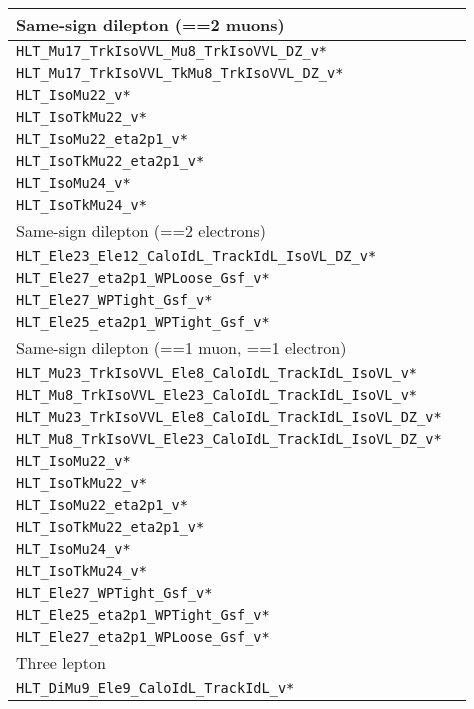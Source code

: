 \begin{table}
  \centering \footnotesize
  \begin{tabular}{ll}\hline
    Same-sign dilepton (==2 muons)\\\hline
    \verb|HLT_Mu17_TrkIsoVVL_Mu8_TrkIsoVVL_DZ_v*|\\
    \verb|HLT_Mu17_TrkIsoVVL_TkMu8_TrkIsoVVL_DZ_v*|\\
    \verb|HLT_IsoMu22_v*|\\
    \verb|HLT_IsoTkMu22_v*|\\
    \verb|HLT_IsoMu22_eta2p1_v*| \\
    \verb|HLT_IsoTkMu22_eta2p1_v*| \\
    \verb|HLT_IsoMu24_v*| \\
    \verb|HLT_IsoTkMu24_v*|\\\hline
    Same-sign dilepton (==2 electrons)\\\hline
    \verb|HLT_Ele23_Ele12_CaloIdL_TrackIdL_IsoVL_DZ_v*|\\
    \verb|HLT_Ele27_eta2p1_WPLoose_Gsf_v*|\\
    \verb|HLT_Ele27_WPTight_Gsf_v*| \\
    \verb|HLT_Ele25_eta2p1_WPTight_Gsf_v*| \\\hline
    Same-sign dilepton (==1 muon, ==1 electron)\\\hline
    \verb|HLT_Mu23_TrkIsoVVL_Ele8_CaloIdL_TrackIdL_IsoVL_v*|\\
    \verb|HLT_Mu8_TrkIsoVVL_Ele23_CaloIdL_TrackIdL_IsoVL_v*|\\
    \verb|HLT_Mu23_TrkIsoVVL_Ele8_CaloIdL_TrackIdL_IsoVL_DZ_v*| \\
    \verb|HLT_Mu8_TrkIsoVVL_Ele23_CaloIdL_TrackIdL_IsoVL_DZ_v*| \\
    \verb|HLT_IsoMu22_v*|\\
    \verb|HLT_IsoTkMu22_v*|\\
    \verb|HLT_IsoMu22_eta2p1_v*| \\
    \verb|HLT_IsoTkMu22_eta2p1_v*| \\
    \verb|HLT_IsoMu24_v*| \\
    \verb|HLT_IsoTkMu24_v*| \\
    \verb|HLT_Ele27_WPTight_Gsf_v*| \\
    \verb|HLT_Ele25_eta2p1_WPTight_Gsf_v*| \\
    \verb|HLT_Ele27_eta2p1_WPLoose_Gsf_v*|\\\hline
    Three lepton\\\hline
    \verb|HLT_DiMu9_Ele9_CaloIdL_TrackIdL_v*|\\

\end{tabular}
\end{table}
